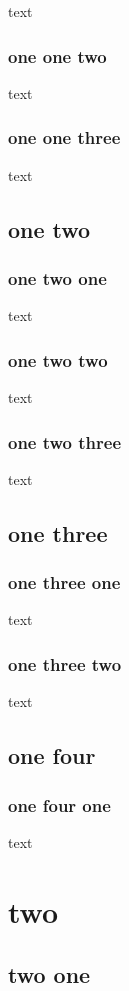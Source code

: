 \documentclass{book}
\begin{document}
text

\subsection{one one two}

text

\subsection{one one three}

text

\section{one two}


\subsection{one two one}

text

\subsection{one two two}
text

\subsection{one two three}
text

\section{one three}

\subsection{one three one}

text

\subsection{one three two}

text

\section{one four}

\subsection{one four one}

text

\chapter{two}

\section{two one}
\end{document}
